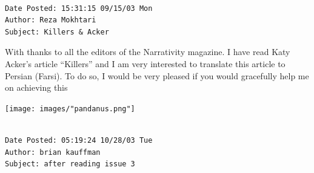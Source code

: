 \documentclass[
]{memoir}
\begin{document}
\begin{verbatim}

Date Posted: 15:31:15 09/15/03 Mon
Author: Reza Mokhtari
Subject: Killers & Acker
\end{verbatim}

With thanks to all the editors of the Narrativity magazine. I have read
Katy Acker's article ``Killers'' and I am very interested to translate
this article to Persian (Farsi). To do so, I would be very pleased if
you would gracefully help me on achieving this

\begin{center}\texttt{[image: images/"pandanus.png"]}\end{center}

\begin{verbatim}

Date Posted: 05:19:24 10/28/03 Tue
Author: brian kauffman
Subject: after reading issue 3
\end{verbatim}
\end{document}
